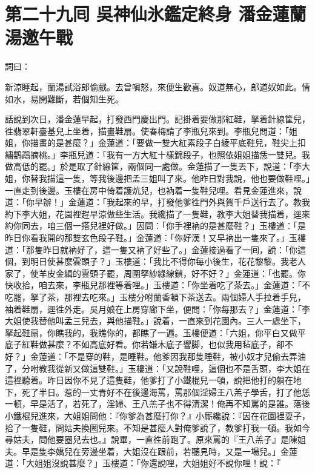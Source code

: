 
\chapter*{第二十九囘 吳神仙氷鑑定終身 潘金蓮蘭湯邀午戰}


詞曰：

\begin{myquote}
新涼睡起，蘭湯試浴郎偷戲。去曾嗔怒，來便生歡喜。奴道無心，郎道奴如此。情如水，易開難斷，若個知生死。

\end{myquote}

話說到次日，潘金蓮早起，打發西門慶出門。記掛着要做那紅鞋，{}拏着針線筐兒，徃翡翠軒臺基兒上坐着，描畫鞋扇。使春梅請了李瓶兒來到。李瓶兒問道：「姐姐，你描畫的是甚麼？」金蓮道：「要做一雙大紅素段子白綾平底鞋兒，鞋尖上扣繡鸚鵡摘桃。」李瓶兒道：「我有一方大紅十樣錦段子，也照依姐姐描恁一雙兒。我做高低的罷。」於是取了針線筐，兩個同一處做。金蓮描了一隻丟下，說道：「李大姐，你替我描這一隻，等我後邊把孟三姐叫了來。他昨日對我說，他也要做鞋哩。」一直走到後邊。玉樓在房中倚着護炕兒，也衲着一隻鞋兒哩。看見金蓮進來，說道：「你早辦！」金蓮道：「我起來的早，打發他爹徃門外與賀千戶送行去了。教我約下李大姐，花園裡趕早涼做些生活。我纔描了一隻鞋，教李大姐替我描着，逕來約你同去，咱三個一搭兒裡好做。」因問：「你手裡衲的是甚麼鞋？」玉樓道：「是昨日你看我開的那雙玄色段子鞋。」金蓮道：「你好漢！又早衲出一隻來了。」玉樓道：「那隻昨日就衲好了，這一隻又衲了好些了。」金蓮接過看了一囘，說：「你這個，到明日使甚麼雲頭子？」玉樓道：「我比不得你每小後生，花花黎黎。{}我老人家了，使羊皮金緝的雲頭子罷，周圍拏紗綠線鎖，好不好？」金蓮道：「也罷。你快收拾，咱去來，李瓶兒那裡等着哩。」玉樓道：「你坐着吃了茶去。」金蓮道：「不吃罷，拏了茶，那裡去吃來。」玉樓分咐蘭香頓下茶送去。兩個婦人手拉着手兒，袖着鞋扇，逕徃外走。吳月娘在上房穿廊下坐，便問：「你每那去？」金蓮道：「李大姐使我替他叫孟三兒去，與他描鞋。」{}說着，一直來到花園內。三人一處坐下，拏起鞋扇，你瞧我的，我瞧你的，{}都瞧了一遍。玉樓便道：「六姐，你平白又做平底子紅鞋做甚麼？不如高底好看。你若嫌木底子響脚，也似我用毡底子，卻不好？」{}金蓮道：「不是穿的鞋，是睡鞋。他爹因我那隻睡鞋，被小奴才兒偷去弄油了，分咐教我從新又做這雙鞋。」玉樓道：「又說鞋哩，這個也不是舌頭，李大姐在這裡聽着。昨日因你不見了這隻鞋，他爹打了小鐵棍兒一頓，說把他打的躺在地下，死了半日。惹的一丈青好不在後邊海罵，罵那個淫婦王八羔子學舌，打了他恁一頓，早是活了，若死了，淫婦、王八羔子也不得清潔！俺再不知罵的是誰。落後小鐵棍兒進來，大姐姐問他：『你爹為甚麼打你？』小厮纔說：『因在花園裡耍子，拾了一隻鞋，問姑夫換圈兒來。不知是甚麼人對俺爹說了，教爹打我一頓。我如今尋姑夫，問他要圈兒去也。』說畢，一直徃前跑了。原來罵的『王八羔子』是陳姐夫。{}早是隻李嬌兒在旁邊坐着，大姐沒在跟前，若聽見時，又是一場兒。」金蓮道：「大姐姐沒說甚麼？」玉樓道：「你還說哩，大姐姐好不說你哩！說：『